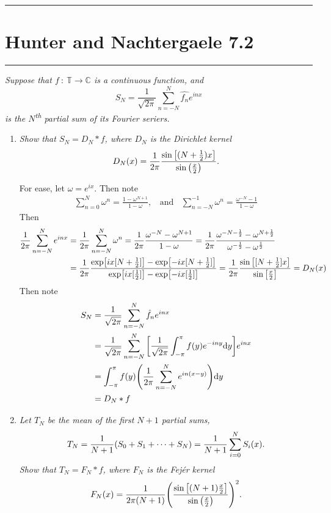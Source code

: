 \documentclass[fontsize=11pt]{article} %
\theoremstyle{plain}
\numberwithin{equation}{section} %
\numberwithin{figure}{section} %
\numberwithin{table}{section} %
\begin{document}
\begin{center}
    \noindent\rule{5cm}{1pt}
\end{center}
\section{\bf Hunter and Nachtergaele 7.2}
\begin{center}
    \noindent\rule{5cm}{1pt}
\end{center}

\emph{Suppose that $f\ :\ \mathbb{T} \rightarrow \mathbb{C}$ is a continuous function, and $$S_N = \frac{1}{\sqrt{2\pi}}\sum_{n=-N}^N \hat{f_n}e^{inx}$$ is the $N$\textsuperscript{th} partial sum of its Fourier seriers.}
\begin{enumerate}[\bf (a)]
    \item
        \emph{Show that $S_N = D_N * f$, where $D_N$ is the \emph{Dirichlet kernel} $$D_N(x) = \frac{1}{2\pi}\frac{\sin\qty[(N+\frac{1}{2})x]}{\sin \qty(\frac{x}{2})}.$$}

        For ease, let $\omega = e^{ix}$.  Then note
        \begin{align*}
            \sum_{n=0}^N \omega^n = \frac{1 - \omega^{N+1}}{1 - \omega},\ \ \ \ \text{and}\ \ \ \ \sum_{n=-N}^{-1}\omega^n = \frac{\omega^{-N} - 1}{1 - \omega}
        \end{align*}
        Then
        \begin{align*}
            \frac{1}{2\pi}\sum_{n=-N}^N e^{inx} &= \frac{1}{2\pi}\sum_{n=-N}^N \omega^n = \frac{1}{2\pi}\frac{\omega^{-N} - \omega^{N+1}}{1 - \omega} = \frac{1}{2\pi}\frac{\omega^{-N - \frac{1}{2}} - \omega^{N + \frac{1}{2}}}{\omega^{-\frac{1}{2}} - \omega^{\frac{1}{2}}} \\
            &= \frac{1}{2\pi}\frac{\exp[ix[N + \frac{1}{2}]] - \exp[-ix[N+\frac{1}{2}]]}{\exp[ix[\frac{1}{2}]] - \exp[-ix[\frac{1}{2}]]} = \frac{1}{2\pi}\frac{\sin\qty[[N+\frac{1}{2}]x]}{\sin\qty[\frac{x}{2}]} = D_N(x)
        \end{align*}
        Then note
        \begin{align*}
            S_N &= \frac{1}{\sqrt{2\pi}}\sum_{n=-N}^N\hat{f}_n e^{inx} \\
            &= \frac{1}{\sqrt{2\pi}}\sum_{n=-N}^N\qty[\frac{1}{\sqrt{2\pi}}\int_{-\pi}^\pi f(y)e^{-iny}\dd y]e^{inx} \\
            &= \int_{-\pi}^\pi f(y)\qty(\frac{1}{2\pi}\sum_{n=-N}^N e^{in(x-y)})\dd y \\
            &= D_N * f
        \end{align*}
    \item
        \emph{Let $T_N$ be the mean of the first $N+1$ partial sums, $$T_N = \frac{1}{N+1}\qty(S_0 + S_1 + \dots + S_N) = \frac{1}{N+1}\sum_{i=0}^N S_i(x).$$  Show that $T_N = F_N * f$, where $F_N$ is the \emph{Fej\'{e}r kernel} $$F_N(x) = \frac{1}{2\pi(N + 1)}\qty(\frac{\sin\qty[(N + 1)\frac{x}{2}]}{\sin\qty(\frac{x}{2})})^2.$$}


\end{enumerate}
\end{document}

